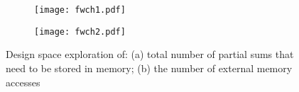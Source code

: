 %
\begin{figure}
\centering
    \begin{subfigure}{.45\textwidth}
    \centering
    \texttt{[image: fwch1.pdf]}
    \caption{ }
    \end{subfigure}
    \begin{subfigure}{.45\textwidth}
    \centering
    \texttt{[image: fwch2.pdf]}
    \caption{ }
    \end{subfigure}
    \caption{Design space exploration of: (a) total number of partial sums that need to be stored in memory; (b) the number of external memory accesses \cite{ma_optimizing_2018}}
    \label{fig:flowchart}
\end{figure}
